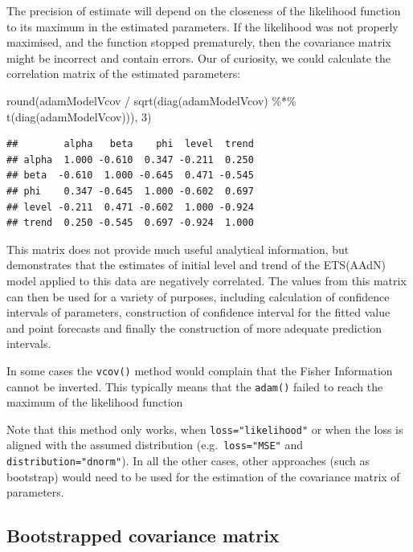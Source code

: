 \documentclass[
]{book}
\newenvironment{Shaded}{\begin{snugshade}}{\end{snugshade}}
\newcommand{\DecValTok}[1]{\textcolor[rgb]{0.00,0.00,0.81}{#1}}
\newcommand{\FunctionTok}[1]{\textcolor[rgb]{0.00,0.00,0.00}{#1}}
\newcommand{\NormalTok}[1]{#1}
\newcommand{\SpecialCharTok}[1]{\textcolor[rgb]{0.00,0.00,0.00}{#1}}
\theoremstyle{definition}
\theoremstyle{definition}
\theoremstyle{definition}
\theoremstyle{definition}
\theoremstyle{remark}
\begin{document}
The precision of estimate will depend on the closeness of the likelihood function to its maximum in the estimated parameters. If the likelihood was not properly maximised, and the function stopped prematurely, then the covariance matrix might be incorrect and contain errors. Our of curiosity, we could calculate the correlation matrix of the estimated parameters:

\begin{Shaded}
\begin{Highlighting}[]
\FunctionTok{round}\NormalTok{(adamModelVcov }\SpecialCharTok{/}
        \FunctionTok{sqrt}\NormalTok{(}\FunctionTok{diag}\NormalTok{(adamModelVcov) }\SpecialCharTok{\%*\%}
               \FunctionTok{t}\NormalTok{(}\FunctionTok{diag}\NormalTok{(adamModelVcov))), }\DecValTok{3}\NormalTok{)}
\end{Highlighting}
\end{Shaded}

\begin{verbatim}
##        alpha   beta    phi  level  trend
## alpha  1.000 -0.610  0.347 -0.211  0.250
## beta  -0.610  1.000 -0.645  0.471 -0.545
## phi    0.347 -0.645  1.000 -0.602  0.697
## level -0.211  0.471 -0.602  1.000 -0.924
## trend  0.250 -0.545  0.697 -0.924  1.000
\end{verbatim}

This matrix does not provide much useful analytical information, but demonstrates that the estimates of initial level and trend of the ETS(AAdN) model applied to this data are negatively correlated. The values from this matrix can then be used for a variety of purposes, including calculation of confidence intervals of parameters, construction of confidence interval for the fitted value and point forecasts and finally the construction of more adequate prediction intervals.

In some cases the \texttt{vcov()} method would complain that the Fisher Information cannot be inverted. This typically means that the \texttt{adam()} failed to reach the maximum of the likelihood function

Note that this method only works, when \texttt{loss="likelihood"} or when the loss is aligned with the assumed distribution (e.g.~\texttt{loss="MSE"} and \texttt{distribution="dnorm"}). In all the other cases, other approaches (such as bootstrap) would need to be used for the estimation of the covariance matrix of parameters.

\hypertarget{bootstrapped-covariance-matrix}{%
\subsection{Bootstrapped covariance matrix}\label{bootstrapped-covariance-matrix}}
\end{document}
